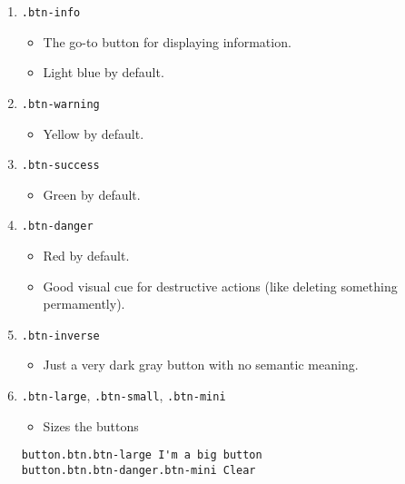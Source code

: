 \documentclass[10pt, twocolumn]{article}
\begin{document}
\begin{enumerate}
\begin{enumerate}
\item \texttt{.btn-info}
\begin{itemize}
\item The go-to button for displaying information.
\item Light blue by default.
\end{itemize}

\item \texttt{.btn-warning}
\begin{itemize}
\item Yellow by default.
\end{itemize}

\item \texttt{.btn-success}
\begin{itemize}
\item Green by default.
\end{itemize}

\item \texttt{.btn-danger}
\begin{itemize}
\item Red by default.
\item Good visual cue for destructive actions (like deleting something permamently).
\end{itemize}

\item \texttt{.btn-inverse}
\begin{itemize}
\item Just a very dark gray button with no semantic meaning.
\end{itemize}

\item \texttt{.btn-large}, \texttt{.btn-small}, \texttt{.btn-mini}
\begin{itemize}
\item Sizes the buttons
\end{itemize}
\begin{lstlisting}[frame=single]
button.btn.btn-large I'm a big button
button.btn.btn-danger.btn-mini Clear
\end{lstlisting}


\end{enumerate}

\end{enumerate}
\end{document}
